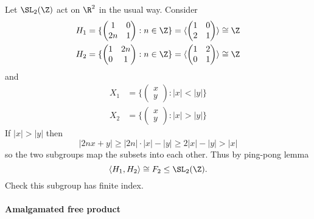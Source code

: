 \documentclass[a4paper]{article}
\begin{document}
\begin{eg}
  Let \(\SL_2(\Z)\) act on \(\R^2\) in the usual way. Consider
  \begin{align*}
    H_1 &= \{
          \begin{pmatrix}
            1 & 0 \\
            2n & 1
          \end{pmatrix}
                 : n \in \Z \}
                 = \langle
                 \begin{pmatrix}
                   1 & 0 \\
                   2 & 1
                 \end{pmatrix}
                       \rangle
                       \cong \Z \\
    H_2 &= \{
          \begin{pmatrix}
            1 & 2n \\
            0 & 1
          \end{pmatrix}
                : n \in \Z\}
                = \langle
                \begin{pmatrix}
                  1 & 2 \\
                  0 & 1
                \end{pmatrix}
                      \rangle
                      \cong \Z
  \end{align*}
  and
  \begin{align*}
    X_1 &= \{
        \begin{pmatrix}
          x \\
          y
        \end{pmatrix}
    : |x| < |y|\} \\
    X_2 & = \{
          \begin{pmatrix}
            x \\
            y
          \end{pmatrix}
    : |x| > |y|\}
  \end{align*}
  If \(|x| > |y|\) then
  \[
    |2nx + y| \geq |2n| \cdot |x| - |y| \geq 2 |x| - |y| > |x|
  \]
  so the two subgroups map the subsets into each other. Thus by ping-pong lemma
  \[
    \langle H_1, H_2 \rangle \cong F_2 \leq \SL_2(\Z).
  \]
  Check this subgroup has finite index.
\end{eg}

\paragraph{Amalgamated free product}
\end{document}

